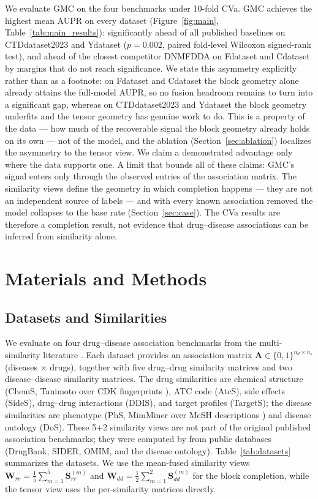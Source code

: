 \documentclass[webpdf,modern,large]{oup-authoring-template}
\begin{document}
We evaluate GMC on the four benchmarks under 10-fold CVa. GMC achieves the highest mean AUPR on every dataset (Figure~\ref{fig:main}, Table~\ref{tab:main_results}): significantly ahead of all published baselines on CTDdataset2023 and Ydataset ($p=0.002$, paired fold-level Wilcoxon signed-rank test), and ahead of the closest competitor DNMFDDA on Fdataset and Cdataset by margins that do not reach significance. We state this asymmetry explicitly rather than as a footnote: on Fdataset and Cdataset the block geometry alone already attains the full-model AUPR, so no fusion headroom remains to turn into a significant gap, whereas on CTDdataset2023 and Ydataset the block geometry underfits and the tensor geometry has genuine work to do. This is a property of the data --- how much of the recoverable signal the block geometry already holds on its own --- not of the model, and the ablation (Section~\ref{sec:ablation}) localizes the asymmetry to the tensor view. We claim a demonstrated advantage only where the data supports one. A limit that bounds all of these claims: GMC's signal enters only through the observed entries of the association matrix. The similarity views define the geometry in which completion happens --- they are not an independent source of labels --- and with every known association removed the model collapses to the base rate (Section~\ref{sec:case}). The CVa results are therefore a completion result, not evidence that drug--disease associations can be inferred from similarity alone.

\section{Materials and Methods}

\subsection{Datasets and Similarities}

We evaluate on four drug--disease association benchmarks from the multi-similarity literature \citep{yang2020msbmf}. Each dataset provides an association matrix $\mathbf{A} \in \{0,1\}^{n_d \times n_s}$ (diseases $\times$ drugs), together with five drug--drug similarity matrices and two disease--disease similarity matrices. The drug similarities are chemical structure (ChemS, Tanimoto over CDK fingerprints \citep{steinbeck2003}), ATC code (AtcS), side effects (SideS), drug--drug interactions (DDIS), and target profiles (TargetS); the disease similarities are phenotype (PhS, MimMiner over MeSH descriptions \citep{vandriel2006}) and disease ontology (DoS). These 5+2 similarity views are not part of the original published association benchmarks; they were computed by \citet{yang2020msbmf} from public databases (DrugBank, SIDER, OMIM, and the disease ontology). Table~\ref{tab:datasets} summarizes the datasets. We use the mean-fused similarity views $\mathbf{W}_{rr} = \frac{1}{5}\sum_{m=1}^5 \mathbf{S}^{(m)}_{rr}$ and $\mathbf{W}_{dd} = \frac{1}{2}\sum_{m=1}^2 \mathbf{S}^{(m)}_{dd}$ for the block completion, while the tensor view uses the per-similarity matrices directly.
\end{document}
